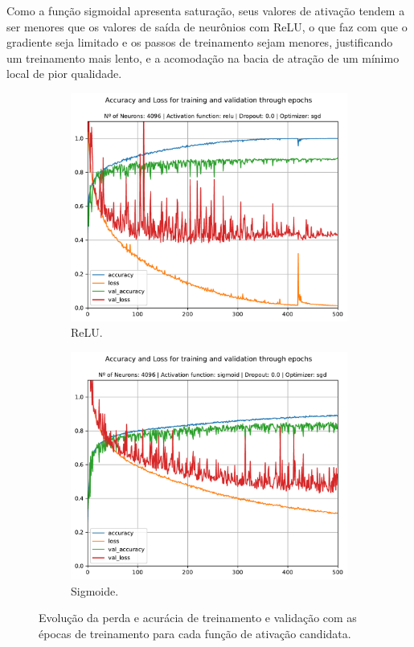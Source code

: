 	Como a função sigmoidal apresenta saturação, seus valores de ativação tendem a ser menores que os valores de saída de neurônios com ReLU, o que faz com que o gradiente seja limitado e os passos de treinamento sejam menores, justificando um treinamento mais lento, e a acomodação na bacia de atração de um mínimo local de pior qualidade.

\begin{figure}[H]
	\centering
	\begin{subfigure}[H]{0.49\textwidth}
		\includegraphics[width = \textwidth]{../../plot/mlp/mlp_4096_relu_0.0_sgd}
		\caption{ReLU.}
		\label{fig:mlp_4096_relu_0.0_sgd_act_fnc}
	\end{subfigure}
	\begin{subfigure}[H]{0.49\textwidth}
		\centering
		\includegraphics[width = \textwidth]{../../plot/mlp/mlp_4096_sigmoid_0.0_sgd}
		\caption{Sigmoide.}
		\label{fig:mlp_4096_sigmoid_0.0_sgd}
	\end{subfigure}
	\caption{Evolução da perda e acurácia de treinamento e validação com as épocas de treinamento para cada função de ativação candidata.}
\end{figure}

